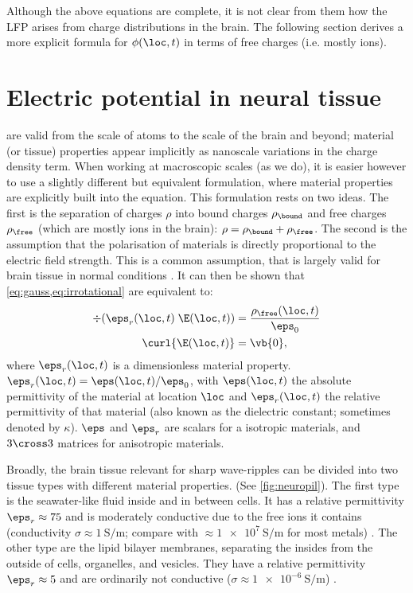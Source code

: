 Although the above equations are complete, it is not clear from them how the LFP arises from charge distributions in the brain. The following section derives a more explicit formula for $\phi(\loc,t)$ in terms of free charges (i.e. mostly ions).




\section{Electric potential in neural tissue}

 are valid from the scale of atoms to the scale of the brain and beyond; material (or tissue) properties appear implicitly as nanoscale variations in the charge density term. When working at macroscopic scales (as we do), it is easier however to use a slightly different but equivalent formulation, where material properties are explicitly built into the equation. This formulation rests on two ideas. The first is the separation of charges $\rho$ into bound charges $\rho_\bound$ and free charges $\rho_\free$ (which are mostly ions in the brain): $\rho = \rho_\bound + \rho_\free$. The second is the assumption that the polarisation of materials is directly proportional to the electric field strength. This is a common assumption, that is largely valid for brain tissue in normal conditions \cite{Nunez2006}. It can then be shown \cite{Feynman2013} that \cref{eq:gauss,eq:irrotational} are equivalent to:
%
\begin{align}
\div(\eps_r(\loc,t)\; \E(\loc,t))
    &= \frac{\rho_\free(\loc,t)}{\eps_0}   \label{eq:gauss_brain} \\
\curl{\E(\loc,t)}
    &= \vb{0},                             \label{eq:irrot_brain}
\end{align}
%
where $\eps_r(\loc,t)$ is a dimensionless material property. $\eps_r(\loc,t) = \eps(\loc,t) / \eps_0$, with $\eps(\loc,t)$ the absolute permittivity of the material at location $\loc$ and $\eps_r(\loc,t)$ the relative permittivity of that material (also known as the dielectric constant; sometimes denoted by $\kappa$). $\eps$ and $\eps_r$ are scalars for a isotropic materials, and $3 \cross 3$ matrices for anisotropic materials.

Broadly, the brain tissue relevant for sharp wave-ripples can be divided into two tissue types with different material properties. (See \cref{fig:neuropil}). The first type is the seawater-like fluid inside and in between cells. It has a relative permittivity $\eps_r \approx 75$ and is moderately conductive due to the free ions it contains (conductivity $\sigma \approx \SI{1}{\siemens\per\metre}$; compare with $\approx \SI{1e7}{\siemens\per\metre}$ for most metals) \cite{Michel2017,Martinsen2015,Marszalek1991,Nunez2006}. The other type are the lipid bilayer membranes, separating the insides from the outside of cells, organelles, and vesicles. They have a relative permittivity $\eps_r \approx 5$ and are ordinarily not conductive ($\sigma \approx \SI{1e-6}{\siemens\per\metre}$)\footnotemark{} \cite{Marszalek1991,Weaver2003}.

